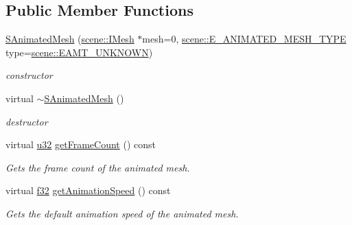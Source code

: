 \subsection*{Public Member Functions}
\begin{DoxyCompactItemize}
\item 
\mbox{\label{structirr_1_1scene_1_1SAnimatedMesh_a9f02f671b75c1009b35bf7d49f277c8d}} 
\hyperlink{structirr_1_1scene_1_1SAnimatedMesh_a9f02f671b75c1009b35bf7d49f277c8d}{S\+Animated\+Mesh} (\hyperlink{classirr_1_1scene_1_1IMesh}{scene\+::\+I\+Mesh} $\ast$mesh=0, \hyperlink{namespaceirr_1_1scene_a2fc85a64604521ca063f1881b5dd1c61}{scene\+::\+E\+\_\+\+A\+N\+I\+M\+A\+T\+E\+D\+\_\+\+M\+E\+S\+H\+\_\+\+T\+Y\+PE} type=\hyperlink{namespaceirr_1_1scene_a2fc85a64604521ca063f1881b5dd1c61a6f44a8730987c53332017ff74048acd0}{scene\+::\+E\+A\+M\+T\+\_\+\+U\+N\+K\+N\+O\+WN})
\begin{DoxyCompactList}\small\item\em constructor \end{DoxyCompactList}\item 
\mbox{\label{structirr_1_1scene_1_1SAnimatedMesh_a59d891b250eb3803b1af81adba447593}} 
virtual \hyperlink{structirr_1_1scene_1_1SAnimatedMesh_a59d891b250eb3803b1af81adba447593}{$\sim$\+S\+Animated\+Mesh} ()
\begin{DoxyCompactList}\small\item\em destructor \end{DoxyCompactList}\item 
virtual \hyperlink{namespaceirr_a0416a53257075833e7002efd0a18e804}{u32} \hyperlink{structirr_1_1scene_1_1SAnimatedMesh_a58d8940d3002792194c74e209a5f2949}{get\+Frame\+Count} () const
\begin{DoxyCompactList}\small\item\em Gets the frame count of the animated mesh. \end{DoxyCompactList}\item 
virtual \hyperlink{namespaceirr_a0277be98d67dc26ff93b1a6a1d086b07}{f32} \hyperlink{structirr_1_1scene_1_1SAnimatedMesh_aa6b6302dad72761e22ba10cc4486b4c8}{get\+Animation\+Speed} () const
\begin{DoxyCompactList}\small\item\em Gets the default animation speed of the animated mesh. \end{DoxyCompactList}\item 

\end{DoxyCompactItemize}
